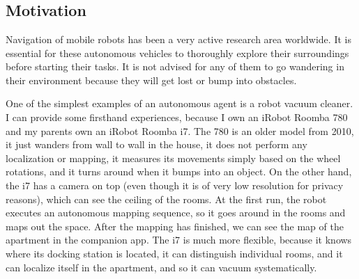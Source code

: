 \chapter{\bevezetes}

\section{Motivation}
Navigation of mobile robots has been a very active research area worldwide. It is essential for these autonomous vehicles to thoroughly explore their surroundings before starting their tasks. It is not advised for any of them to go wandering in their environment because they will get lost or bump into obstacles.

One of the simplest examples of an autonomous agent is a robot vacuum cleaner. I can provide some firsthand experiences, because I own an iRobot Roomba 780 and my parents own an iRobot Roomba i7. The 780 is an older model from 2010, it just wanders from wall to wall in the house, it does not perform any localization or mapping, it measures its movements simply based on the wheel rotations, and it turns around when it bumps into an object. On the other hand, the i7 has a camera on top (even though it is of very low resolution for privacy reasons), which can see the ceiling of the rooms. At the first run, the robot executes an autonomous mapping sequence, so it goes around in the rooms and maps out the space. After the mapping has finished, we can see the map of the apartment in the companion app. The i7 is much more flexible, because it knows where its docking station is located, it can distinguish individual rooms, and it can localize itself in the apartment, and so it can vacuum systematically.

